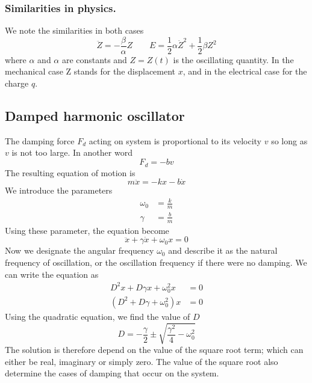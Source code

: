 \documentclass[../../main.tex]{subfiles}
\begin{document}
\subsubsection{Similarities in physics.} We note the similarities in both cases 
\begin{equation*}
    \ddot{Z}=-\frac{\beta}{\alpha}Z\qquad E=\frac{1}{2}\alpha\dot{Z}^2+\frac{1}{2}\beta Z^2
\end{equation*}
where $\alpha$ and $\alpha$ are constants and $Z = Z(t)$ is the oscillating quantity. In the mechanical case Z stands for the displacement $x$, and in the electrical case for the charge $q$.

\subsection{Damped harmonic oscillator} 
The damping force $F_d$ acting on system is proportional to its velocity $v$ so long as $v$ is not too large. In another word
\begin{equation*}
    F_d=-bv
\end{equation*}
The resulting equation of motion is
\begin{equation*}
    m\ddot{x}=-kx-b\dot{x}
\end{equation*}
We introduce the parameters
\begin{align*}
    \omega_0&=\frac{k}{m}\\
    \gamma&=\frac{b}{m}
\end{align*}
Using these parameter, the equation become
\begin{equation*}
    \ddot{x}+\gamma\dot{x}+\omega_0 x=0
\end{equation*}
Now we designate the angular frequency $\omega_0$ and describe it as the natural frequency of oscillation, or the oscillation frequency if there were no damping. We can write the equation as\begin{align*}
    D^2x+D\gamma x+\omega_0^2x&=0\\
    (D^2+D\gamma +\omega_0^2)x&=0
\end{align*}
Using the quadratic equation, we find the value of $D$
\begin{equation*}
    D=-\frac{\gamma}{2}\pm \sqrt{\frac{\gamma^2}{4}-\omega_0^2}
\end{equation*}
The solution is therefore depend on the value of the square root term; which can either be real, imaginary or simply zero. The value of the square root also determine the cases of damping that occur on the system. 
\end{document}
